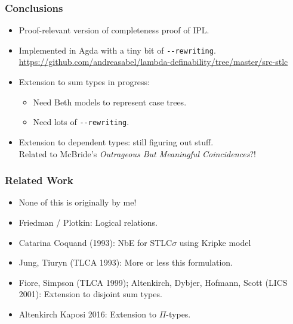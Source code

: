 \documentclass[t,fleqn,usenames,dvipsnames]{beamer}
\newcommand{\cAnn}{\color{red!80!black}}%
\renewcommand{\emph}[1]{{\cAnn#1}}
\newcommand{\cType}{\color{orange!60!black}}
\renewcommand{\emph}[1]{\textit{\cType#1}}
\begin{document}
\begin{frame}[fragile=singleslide]
  \frametitle{Conclusions}
  \vspace{-3ex}
  \begin{itemize}
  \item Proof-relevant version of completeness proof of IPL.
  \item Implemented in Agda with a tiny bit of \verb|--rewriting|.\\
  \url{https://github.com/andreasabel/lambda-definability/tree/master/src-stlc}
  \item Extension to sum types in progress:
    \begin{itemize}
    \item Need Beth models to represent case trees.
    \item Need lots of \verb|--rewriting|.
    \end{itemize}
  \item Extension to dependent types: still figuring out stuff. \\
    Related to McBride's \emph{Outrageous But Meaningful Coincidences}?!
  \end{itemize}
\end{frame}

\begin{frame}%
  \frametitle{Related Work}
  \begin{itemize}
  \item None of this is originally by me!
  \item Friedman / Plotkin: Logical relations.
  \item Catarina Coquand (1993): NbE for STLC$\sigma$ using Kripke model
  \item Jung, Tiuryn (TLCA 1993): More or less this formulation.
  \item Fiore, Simpson (TLCA 1999); Altenkirch, Dybjer, Hofmann, Scott
    (LICS 2001): Extension to disjoint sum types.
  \item Altenkirch Kaposi 2016: Extension to $\Pi$-types.
  \end{itemize}
\end{frame}





% 
\end{document}
